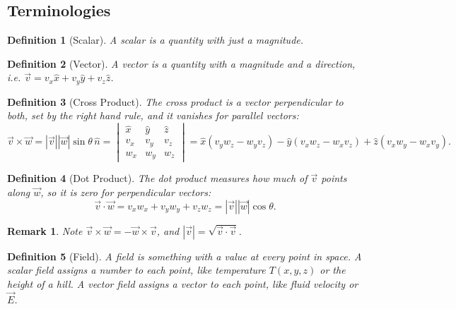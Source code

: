 \documentclass{article}
\newtheorem{definition}{Definition}
\newtheorem{remark}{Remark}
\begin{document}
\subsection{Terminologies}
\begin{definition}[Scalar]
    A scalar is a quantity with just a magnitude.
\end{definition}
\begin{definition}[Vector]
    A vector is a quantity with a magnitude and a direction, i.e. $\vec{v} = v_x\hat{x} + v_y\hat{y} + v_z\hat{z}$.
\end{definition}
\begin{definition}[Cross Product]
    The cross product is a vector perpendicular to both, set by the right hand rule, and it vanishes for parallel vectors:
    \begin{equation}
        \vec{v}\times\vec{w} = |\vec{v}||\vec{w}|\sin\theta\,\hat{n}
        = \begin{vmatrix} \hat{x} & \hat{y} & \hat{z} \\ v_x & v_y & v_z \\ w_x & w_y & w_z \end{vmatrix}
        = \hat{x}(v_yw_z - w_yv_z) - \hat{y}(v_xw_z - w_xv_z) + \hat{z}(v_xw_y - w_xv_y).
    \end{equation}
\end{definition}
\begin{definition}[Dot Product]
    The dot product measures how much of $\vec{v}$ points along $\vec{w}$, so it is zero for perpendicular vectors:
    \begin{equation}
        \vec{v}\cdot\vec{w} = v_xw_x + v_yw_y + v_zw_z = |\vec{v}||\vec{w}|\cos\theta.
    \end{equation}
\end{definition}
\begin{remark}
    Note $\vec{v}\times\vec{w} = -\vec{w}\times\vec{v}$, and $|\vec{v}| = \sqrt{\vec{v}\cdot\vec{v}}$.
\end{remark}
\begin{definition}[Field]
    A field is something with a value at every point in space. A scalar field assigns a number to each point, like temperature $T(x,y,z)$ or the height of a hill. A vector field assigns a vector to each point, like fluid velocity or $\vec{E}$.
\end{definition}
\end{document}
